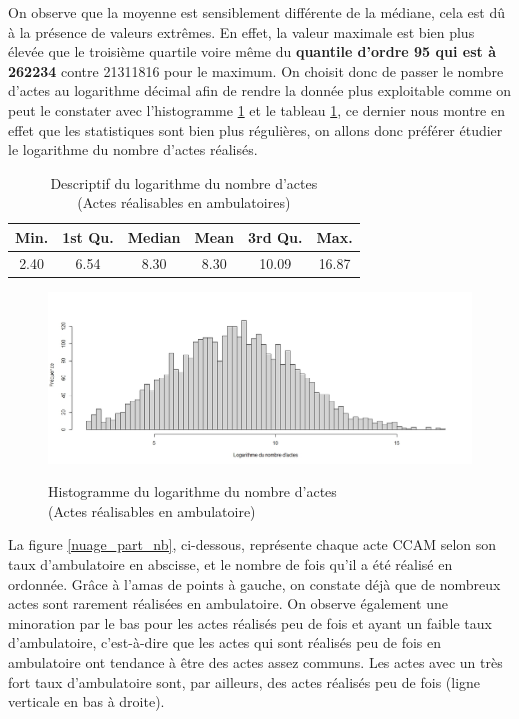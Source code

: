 On observe que la moyenne est sensiblement différente de la médiane, cela est dû à la présence de valeurs extrêmes. En effet, la valeur maximale est bien plus élevée que le troisième quartile voire même du \textbf{quantile d'ordre 95 qui est à 262234} contre 21311816 pour le maximum. On choisit donc de passer le nombre d'actes au logarithme décimal afin de rendre la donnée plus exploitable comme on peut le constater avec l'histogramme \ref{log_nb_actes} et le tableau \ref{log_stat_nb}, ce dernier nous montre en effet que les statistiques sont bien plus régulières, on allons donc préférer étudier le logarithme du nombre d'actes réalisés.


\begin{table}[!ht]
\centering
\caption{Descriptif du logarithme du nombre d'actes\\(Actes réalisables en ambulatoires)} 
\label{log_stat_nb}
\begin{tabular}{cccccc}
  \hline
Min. & 1st Qu. & Median & Mean & 3rd Qu. & Max. \\ 
  \hline
2.40 & 6.54 & 8.30 & 8.30 & 10.09 & 16.87 \\ 
   \hline
\end{tabular}
\end{table}



\begin{figure}[!ht]
    \centering
    \caption{Histogramme du logarithme du nombre d'actes\\(Actes réalisables en ambulatoire)}
    \includegraphics[scale=0.55]{Images/log_nb_actes.jpeg}
    \label{log_nb_actes}
\end{figure}

La figure \ref{nuage_part_nb}, ci-dessous, représente chaque acte CCAM selon son taux d'ambulatoire en abscisse, et le nombre de fois qu'il a été réalisé en ordonnée. Grâce à l'amas de points à gauche, on constate déjà que de nombreux actes sont rarement réalisées en ambulatoire. On observe également une minoration par le bas pour les actes réalisés peu de fois et ayant un faible taux d'ambulatoire, c'est-à-dire que les actes qui sont réalisés peu de fois en ambulatoire ont tendance à être des actes assez communs. Les actes avec un très fort taux d'ambulatoire sont, par ailleurs, des actes réalisés peu de fois (ligne verticale en bas à droite).


